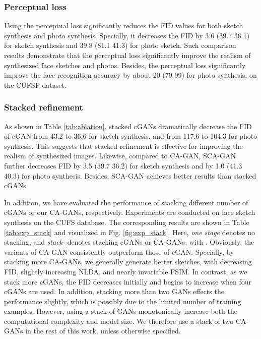 \documentclass[journal]{IEEEtran}
\begin{document}
\subsubsection{Perceptual loss}
Using the perceptual loss  significantly reduces the FID values for both sketch synthesis and photo synthesis. Specially, it decreases the FID by 3.6 (39.7  36.1) for sketch synthesis and 39.8 (81.1  41.3) for photo sketch. 
Such comparison results demonstrate that the perceptual loss significantly improve the realism of synthesized face sketches and photos. Besides, the perceptual loss significantly improve the face recognition accuracy by about 20 (79  99) for photo synthesis, on the CUFSF dataset. 

\subsubsection{Stacked refinement}
\label{ssec:exp_stack}
As shown in Table \ref{tab:ablation}, stacked cGANs dramatically decrease the FID of cGAN from 43.2 to 36.6 for sketch synthesis, and from 117.6 to 104.3 for photo synthesis. This suggests that stacked refinement is effective for improving the realism of synthesized images. Likewise, compared to CA-GAN, SCA-GAN further decreases FID by 3.5 (39.7  36.2) for sketch synthesis and by 1.0 (41.3  40.3) for photo synthesis. Besides, SCA-GAN achieves better results than stacked cGANs. 

In addition, we have evaluated the performance of stacking different number of cGANs or our CA-GANs, respectively. Experiments are conducted on face sketch synthesis on the CUFS database. The corresponding results are shown in Table \ref{tab:exp_stack} and visualized in Fig. \ref{fig:exp_stack}. Here, \textit{one stage} denotes no stacking, and \textit{stack-} denotes stacking  cGANs or CA-GANs, with . 
Obviously, the variants of CA-GAN consistently outperform those of cGAN. Specially, by stacking more CA-GANs, we generally generate better sketches, with decreasing FID, slightly increasing NLDA, and nearly invariable FSIM. In contrast, as we stack more cGANs, the FID decreases initially and begins to increase when four cGANs are used. In addition, stacking more than two GANs effects the performance slightly, which is possibly due to the limited number of training examples. However, using a stack of GANs monotonically increase both the computational complexity and model size. We therefore use a stack of two CA-GANs in the rest of this work, unless otherwise specified.
\end{document}
